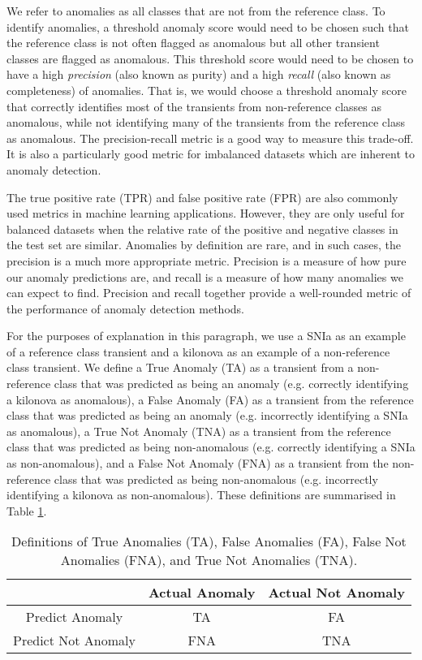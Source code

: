 \documentclass[fleqn,usenatbib]{mnras}
\begin{document}
We refer to anomalies as all classes that are not from the reference class. To identify anomalies, a threshold anomaly score would need to be chosen such that the reference class is not often flagged as anomalous but all other transient classes are flagged as anomalous. This threshold score would need to be chosen to have a high \textit{precision} (also known as purity) and a high \textit{recall} (also known as completeness) of anomalies. That is, we would choose a threshold anomaly score that correctly identifies most of the transients from non-reference classes as anomalous, while not identifying many of the transients from the reference class as anomalous. The precision-recall metric is a good way to measure this trade-off. It is also a particularly good metric for imbalanced datasets \citep{Saito2015PRvsROC} which are inherent to anomaly detection.

The true positive rate (TPR) and false positive rate (FPR) are also commonly used metrics in machine learning applications. However, they are only useful for balanced datasets when the relative rate of the positive and negative classes in the test set are similar. Anomalies by definition are rare, and in such cases, the precision is a much more appropriate metric. Precision is a measure of how pure our anomaly predictions are, and recall is a measure of how many anomalies we can expect to find. Precision and recall together provide a well-rounded metric of the performance of anomaly detection methods.

For the purposes of explanation in this paragraph, we use a SNIa as an example of a reference class transient and a kilonova as an example of a non-reference class transient. We define a True Anomaly (TA) as a transient from a non-reference class that was predicted as being an anomaly (e.g. correctly identifying a kilonova as anomalous), a False Anomaly (FA) as a transient from the reference class that was predicted as being an anomaly (e.g. incorrectly identifying a SNIa as anomalous), a True Not Anomaly (TNA) as a transient from the reference class that was predicted as being non-anomalous (e.g. correctly identifying a SNIa as non-anomalous), and a False Not Anomaly (FNA) as a transient from the non-reference class that was predicted as being non-anomalous (e.g. incorrectly identifying a kilonova as non-anomalous). These definitions are summarised in Table \ref{tab:True_anomaly_table}.

\begin{table}
    \centering
    \begin{tabular}{c|c|c|}
          & Actual Anomaly & Actual Not Anomaly \\ \hline
         Predict Anomaly & TA & FA \\\hline 
         Predict Not Anomaly & FNA & TNA \\ \hline 
    \end{tabular}
    \caption{Definitions of True Anomalies (TA), False Anomalies (FA), False Not Anomalies (FNA), and True Not Anomalies (TNA).}
    \label{tab:True_anomaly_table}
\end{table}
\end{document}
